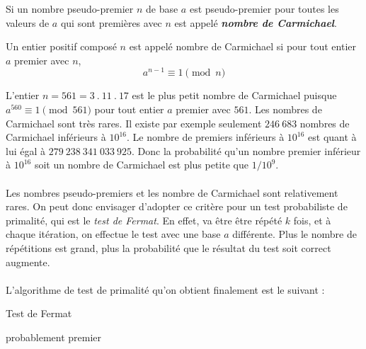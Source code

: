 \begin{itemize}
				Si un nombre pseudo-premier $n$ de base $a$ est pseudo-premier pour toutes les valeurs de $a$ qui sont premières avec $n$ est appelé \textit{\textbf{nombre de Carmichael}}. 
			
					\vspace{-1.5em}\begin{adjustwidth}{1.5cm}{1.5cm} 
					\begin{Def}
						\label{Carmich}
						Un entier positif composé $n$ est appelé nombre de Carmichael si pour tout entier $a$ premier avec $n$,
						\[a^{n-1}\equiv 1 \pmod n\]
					\end{Def}
					\end{adjustwidth}\vspace{0.5em}
					
				L'entier $n = 561 = 3\ .\ 11\ .\ 17$ est le plus petit nombre de Carmichael puisque $a^{560} \equiv 1 \pmod 561$ pour tout entier $a$ premier avec $561$. Les nombres de Carmichael sont très rares. Il existe par exemple seulement $246\ 683$ nombres de Carmichael inférieurs à $10^{16}$. Le nombre de premiers inférieurs à $10^{16}$ est quant à lui égal à $279\ 238\ 341\ 033\ 925$. Donc la probabilité qu'un nombre premier inférieur à $10^{16}$ soit un nombre de Carmichael est plus petite que $1/10^{9}$.
			
		\end{itemize}
		
		\paragraph{}Les nombres pseudo-premiers et les nombre de Carmichael sont relativement rares. On peut donc envisager d'adopter ce critère pour un test probabiliste de primalité, qui est le \textit{test de Fermat}. En effet, va être être répété $k$ fois, et à chaque itération, on effectue le test avec une base $a$ différente. Plus le nombre de répétitions est grand, plus la probabilité que le résultat du test soit correct augmente.
		
		\paragraph{} L'algorithme de test de primalité qu'on obtient finalement est le suivant :\\
		
		\begin{algorithm}[H]
			\caption{Test de Fermat}\label{TF}
		\Retour probablement premier\;
		\end{algorithm}
		
